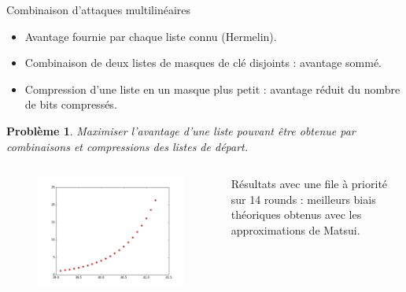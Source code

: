 \documentclass{beamer}
\newtheorem*{Prob}{Problème}
\begin{document}
\begin{frame}{Combinaison d'attaques multilinéaires}

\begin{itemize}
	\item Avantage fournie par chaque liste connu (Hermelin).
	\item Combinaison de deux listes de masques de clé disjoints : avantage sommé.
	\item Compression d'une liste en un masque plus petit : avantage réduit du nombre de bits compressés.
\end{itemize}

	\vspace{-0.2cm}
\begin{Prob}
Maximiser l'avantage d'une liste pouvant être obtenue par combinaisons et compressions des listes de départ.
\end{Prob}
	\vspace{-0.5cm}

	\begin{columns}
		\begin{column}{0.5\textwidth}
\begin{figure}
	\centering
	\includegraphics[scale=0.25]{fig1}
\end{figure}
		\end{column}
		\begin{column}{0.45\textwidth}
Résultats avec une file à priorité sur 14 rounds : meilleurs biais théoriques obtenus avec les approximations de Matsui.
		\end{column}
	\end{columns}

\end{frame}
\end{document}
